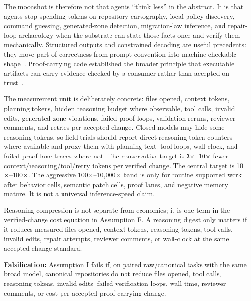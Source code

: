 The moonshot is therefore not that agents ``think less'' in the abstract. It is that agents stop spending tokens on repository cartography, local policy discovery, command guessing, generated-zone detection, migration-law inference, and repair-loop archaeology when the substrate can state those facts once and verify them mechanically. Structured outputs and constrained decoding are useful precedents: they move part of correctness from prompt convention into machine-checkable shape~\cite{openaiStructuredOutputs,xgrammar}. Proof-carrying code established the broader principle that executable artifacts can carry evidence checked by a consumer rather than accepted on trust~\cite{proofCarryingCode}.

The measurement unit is deliberately concrete: files opened, context tokens, planning tokens, hidden reasoning budget where observable, tool calls, invalid edits, generated-zone violations, failed proof loops, validation reruns, reviewer comments, and retries per accepted change. Closed models may hide some reasoning tokens, so field trials should report direct reasoning-token counters where available and proxy them with planning text, tool loops, wall-clock, and failed proof-lane traces where not. The conservative target is 3$\times$--10$\times$ fewer context/reasoning/tool/retry tokens per verified change. The central target is 10$\times$--100$\times$. The aggressive 100$\times$--10{,}000$\times$ band is only for routine supported work after behavior cells, semantic patch cells, proof lanes, and negative memory mature. It is not a universal inference-speed claim.

Reasoning compression is not separate from economics; it is one term in the verified-change cost equation in Assumption F. A reasoning digest only matters if it reduces measured files opened, context tokens, reasoning tokens, tool calls, invalid edits, repair attempts, reviewer comments, or wall-clock at the same accepted-change standard.

\textbf{Falsification:} Assumption I fails if, on paired raw/canonical tasks with the same broad model, canonical repositories do not reduce files opened, tool calls, reasoning tokens, invalid edits, failed verification loops, wall time, reviewer comments, or cost per accepted proof-carrying change.

